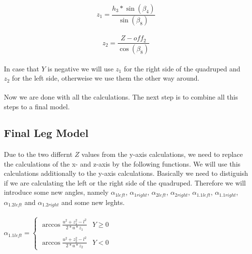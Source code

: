 \documentclass{article}
\begin{document}
    \paragraph{}
    \begin{equation}
        z_1 = \frac{h_3 * \sin(\beta_4)}{\sin(\beta_8)}
    \end{equation}

    \paragraph{}
    \begin{equation}
        z_2 = \frac{Z - off_2}{\cos(\beta_8)}
    \end{equation}

    \paragraph{}
    In case that $Y$ is negative we will use $z_1$ for the right side of the quadruped and $z_2$ for the left side, otherweise we use them the other way around.

    \paragraph{}
    Now we are done with all the calculations. The next step is to combine all this steps to a final model. 
    


    \pagebreak
    \subsection{Final Leg Model}
    \paragraph{}
    Due to the two differnt $Z$ values from the y-axis calculations, we need to replace the calculations of the x- and z-axis by the following functions. We will use this calculations additionally to the y-axis calculations. Basically we need to distiguish if we are calculating the left or the right side of the quadruped. Therefore we will introduce some new angles, namely $\alpha_{1left}$, $\alpha_{1right}$, $\alpha_{2left}$, $\alpha_{2right}$, $\alpha_{1.1left}$, $\alpha_{1.1right}$, $\alpha_{1.2left}$ and $\alpha_{1.2right}$ and some new leghts.

    \paragraph{}
    $\alpha_{1.1left} = \left\{
    \begin{array}{ll}
    \arccos \frac{u^2 + z_1^2 - l^2}{2 * u * z_1} & Y \ge 0 \\ \\
    \arccos \frac{u^2 + z_2^2 - l^2}{2 * u * z_2} & Y < 0
    \end{array}
    \right. $ 
\end{document}
